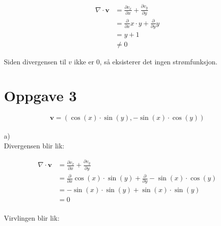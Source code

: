 \documentclass[12pt, a4paper]{article}
\begin{document}
\begin{equation}
    \begin{split}
        \nabla \cdot \textbf{v} &= \frac{\partial v_x}{\partial x} + \frac{\partial v_y}{\partial y} \\
                                &= \frac{\partial}{\partial x} x \cdot y + \frac{\partial}{\partial y} y \\
                                &= y + 1 \\
                                &\neq 0
    \end{split}
\end{equation}

Siden divergensen til $v$ ikke er $0$, så eksisterer det ingen strømfunksjon.




\newpage
\section*{Oppgave 3}

\begin{equation}
    \textbf{v} = (\cos(x) \cdot \sin(y), -\sin(x) \cdot \cos(y))
\end{equation}
\\
a)\\
Divergensen blir lik:

\begin{equation}
    \begin{split}
        \nabla \cdot \textbf{v} &= \frac{\partial v_x}{\partial x} + \frac{\partial v_y}{\partial y} \\
                                &= \frac{\partial}{\partial x} \cos(x) \cdot \sin(y) + \frac{\partial}{\partial y} -\sin(x) \cdot \cos(y) \\
                                &= -\sin(x) \cdot \sin(y) + \sin(x) \cdot \sin(y) \\
                                &= 0
    \end{split}
\end{equation}
\\
Virvlingen blir lik:
\end{document}
